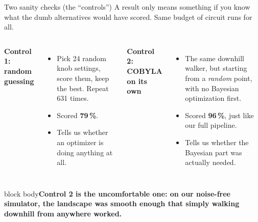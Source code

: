 \documentclass[aspectratio=169,11pt]{beamer}
\newcommand{\takeaway}[1]{\begin{beamercolorbox}[rounded=true,sep=6pt,wd=\textwidth]{block body}\textbf{#1}\end{beamercolorbox}}
\begin{document}
\begin{frame}{Two sanity checks (the ``controls'')}
  \small
  A result only means something if you know what the dumb alternatives would have scored. Same budget of circuit runs for all.
  \vspace{0.6em}
  \begin{columns}[T]
      \textbf{Control 1: random guessing}
      \begin{itemize}
        \item Pick 24 random knob settings, score them, keep the best. Repeat 631 times.
        \item Scored \textbf{79\,\%}.
        \item Tells us whether an optimizer is doing anything at all.
      \end{itemize}
      \textbf{Control 2: COBYLA on its own}
      \begin{itemize}
        \item The same downhill walker, but starting from a \emph{random} point, with no Bayesian optimization first.
        \item Scored \textbf{96\,\%}, just like our full pipeline.
        \item Tells us whether the Bayesian part was actually needed.
      \end{itemize}
  \end{columns}
  \vspace{0.8em}
  \takeaway{Control 2 is the uncomfortable one: on our noise-free simulator, the landscape was smooth enough that simply walking downhill from anywhere worked.}
\end{frame}
\end{document}
